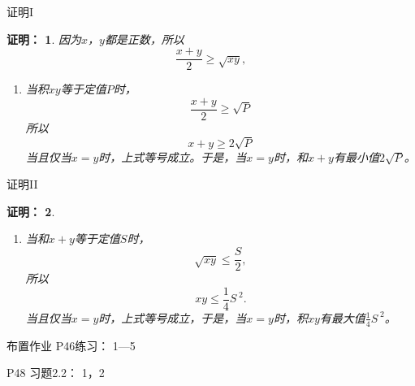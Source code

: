\documentclass[aspectratio=169,13pt] {beamer}
\newtheorem{prooft}{证明：}
\theoremstyle{definition}
\begin{document}
\begin{frame}{证明I}
	
	\begin{prooft}
	因为$x$，$y$都是正数，所以
	\[ 
	\frac{x+y}{2}\geqslant \sqrt{xy},
	\]
	\begin{enumerate}
		\item 当积$xy$等于定值$P$时，
		\[
		\frac{x+y}{2} \geqslant \sqrt{P}
		\]
		所以
		\[
		x+y \geqslant 2\sqrt{P}
		\]
		当且仅当$x=y$时，上式等号成立。于是，当$x=y$时，和$x+y$有最小值$2\sqrt{P}$。
		
		
	\end{enumerate}
\end{prooft}
\end{frame}

\begin{frame}{证明II}
	\begin{prooft}
		
	\begin{enumerate}
		\addtocounter{enumi}{1}
		
		\item 当和$x+y$等于定值$S$时，
		\[
		\sqrt{xy} \leqslant \frac{S}{2},
		\]
		所以
		\[
		xy \leqslant \frac{1}{4}S^{\;2}.
		\]
		当且仅当$x=y$时，上式等号成立，于是，当$x=y$时，积$xy$有最大值$\frac{1}{4}S^{\;2}$。
	\end{enumerate}
\end{prooft}
\end{frame}

\begin{frame}{布置作业}
	P46练习： 1---5
	
	P48 习题2.2：  1，2
\end{frame}
\end{document}
